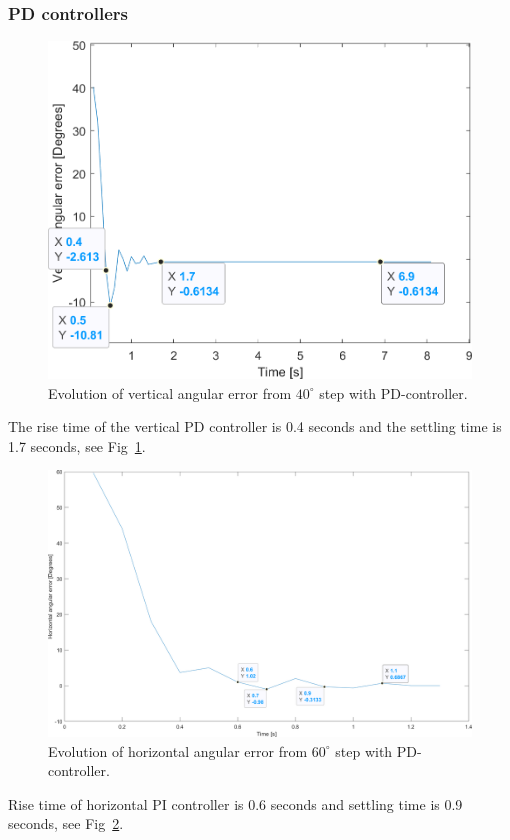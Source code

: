 \subsubsection{PD controllers}
\label{sec:simon14}
\begin{figure}[h]
\centering
\includegraphics[width=\linewidth]{sections/assets/Vertical_PD_controller.png}
\caption{Evolution of vertical angular error from \(40^{\circ}\) step with PD-controller.}
\label{vert_PD}
\end{figure}
The rise time of the vertical PD controller is 0.4 seconds and the settling time is 1.7 seconds, see Fig~\ref{vert_PD}.
\begin{figure}[h]
\centering
\includegraphics[width=\linewidth]{sections/assets/Horizontal_PD_controller.png}
\caption{Evolution of horizontal angular error from \(60^{\circ}\) step with PD-controller.}
\label{Horizontal_PD}
\end{figure}
Rise time of horizontal PI controller is 0.6 seconds and settling time is 0.9 seconds, see Fig~\ref{Horizontal_PD}.

